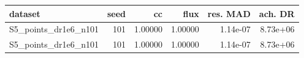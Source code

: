 \begin{tabular}{lrrrrr}
\toprule
dataset & seed & cc & flux & res. MAD & ach. DR \\
\midrule
S5\_points\_dr1e6\_n101 & 101 & 1.00000 & 1.00000 & 1.14e-07 & 8.73e+06 \\
S5\_points\_dr1e6\_n101 & 101 & 1.00000 & 1.00000 & 1.14e-07 & 8.73e+06 \\
\bottomrule
\end{tabular}
